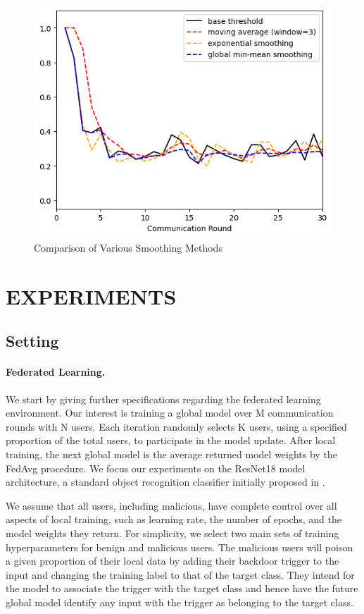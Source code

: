 \documentclass{article} %
\begin{document}
\begin{figure}[H]
    \centering
    
    \includegraphics[width=.5\textwidth]{make_article/make_visuals/visuals/smoothing--d_rounds30.png}
    \caption{Comparison of Various Smoothing Methods}
    \label{fig:smoothing}
\end{figure}

\section{EXPERIMENTS}

%
\subsection{Setting}

\paragraph{Federated Learning.} We start by giving further specifications regarding the federated learning environment. Our interest is training a global model over M communication rounds with N users. Each iteration randomly selects K users, using a specified proportion of the total users, to participate in the model update. After local training, the next global model is the average returned model weights by the FedAvg procedure. We focus  our experiments on the ResNet18 model architecture, a standard object recognition classifier initially proposed in \cite{resnet}. 

We assume that all users, including malicious, have complete control over all aspects of local training, such as learning rate, the number of epochs, and the model weights they return. For simplicity, we select two main sets of training hyperparameters for benign and malicious users. The malicious users will poison a given proportion of their local data by adding their backdoor trigger to the input and changing the training label to that of the target class. They intend for the model to associate the trigger with the target class and hence have the future global model identify any input with the trigger as belonging to the target class. 
\end{document}
